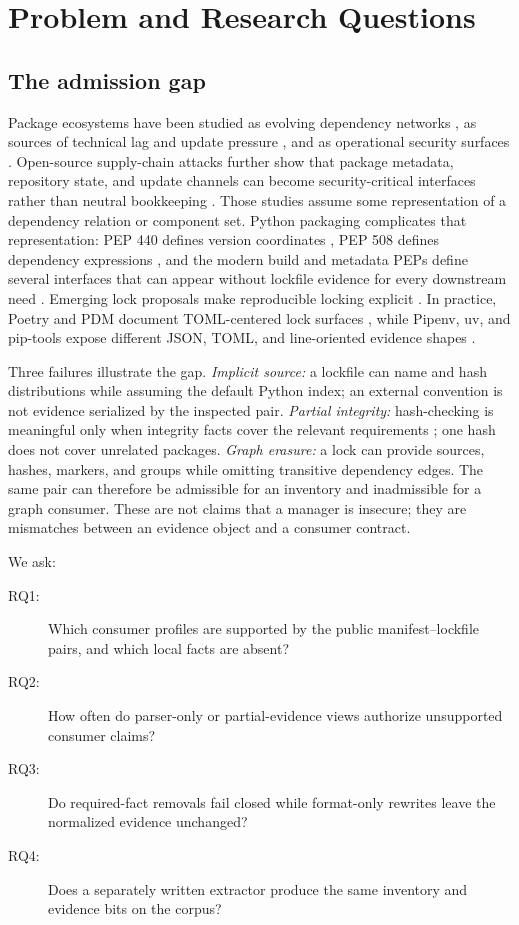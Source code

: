 \documentclass[10pt,conference]{IEEEtran}
\begin{document}
\section{Problem and Research Questions}
\subsection{The admission gap}
Package ecosystems have been studied as evolving dependency networks \cite{decan2019evolution,wittern2016dynamics,kikas2017structure}, as sources of technical lag and update pressure \cite{cox2015freshness,decan2018lag,kula2018updates}, and as operational security surfaces \cite{decan2018npmsec,zimmermann2019smallworld,vu2023badsnakes}. Open-source supply-chain attacks further show that package metadata, repository state, and update channels can become security-critical interfaces rather than neutral bookkeeping \cite{ohm2020backstabber}. Those studies assume some representation of a dependency relation or component set. Python packaging complicates that representation: PEP 440 defines version coordinates \cite{pep440}, PEP 508 defines dependency expressions \cite{pep508}, and the modern build and metadata PEPs define several interfaces that can appear without lockfile evidence for every downstream need \cite{pep517,pep518,pep621}. Emerging lock proposals make reproducible locking explicit \cite{pep665,pep751,pypaPylock}. In practice, Poetry and PDM document TOML-centered lock surfaces \cite{poetryDocs,pdmDocs}, while Pipenv, uv, and pip-tools expose different JSON, TOML, and line-oriented evidence shapes \cite{pipenvDocs,uvDocs,pipToolsDocs}.

Three failures illustrate the gap. \emph{Implicit source:} a lockfile can name and hash distributions while assuming the default Python index; an external convention is not evidence serialized by the inspected pair. \emph{Partial integrity:} hash-checking is meaningful only when integrity facts cover the relevant requirements \cite{pipHashDocs}; one hash does not cover unrelated packages. \emph{Graph erasure:} a lock can provide sources, hashes, markers, and groups while omitting transitive dependency edges. The same pair can therefore be admissible for an inventory and inadmissible for a graph consumer. These are not claims that a manager is insecure; they are mismatches between an evidence object and a consumer contract.

We ask:
\begin{description}
\item[RQ1:] Which consumer profiles are supported by the public manifest--lockfile pairs, and which local facts are absent?
\item[RQ2:] How often do parser-only or partial-evidence views authorize unsupported consumer claims?
\item[RQ3:] Do required-fact removals fail closed while format-only rewrites leave the normalized evidence unchanged?
\item[RQ4:] Does a separately written extractor produce the same inventory and evidence bits on the corpus?
\end{description}
\end{document}
